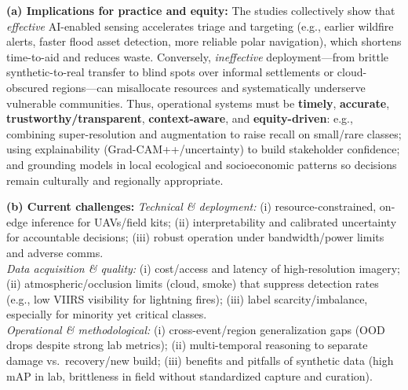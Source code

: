 \documentclass[conference,a4paper]{IEEEtran}
\begin{document}
\noindent\hspace*{1em}\textbf{(a) Implications for practice and equity:}
The studies collectively show that \emph{effective} AI-enabled sensing accelerates triage and targeting (e.g., earlier wildfire alerts, faster flood asset detection, more reliable polar navigation), which shortens time-to-aid and reduces waste. Conversely, \emph{ineffective} deployment---from brittle synthetic-to-real transfer to blind spots over informal settlements or cloud-obscured regions---can misallocate resources and systematically underserve vulnerable communities. Thus, operational systems must be \textbf{timely}, \textbf{accurate}, \textbf{trustworthy/transparent}, \textbf{context-aware}, and \textbf{equity-driven}: e.g., combining super-resolution and augmentation to raise recall on small/rare classes; using explainability (Grad-CAM++/uncertainty) to build stakeholder confidence; and grounding models in local ecological and socioeconomic patterns so decisions remain culturally and regionally appropriate.

\noindent\hspace*{1em}\textbf{(b) Current challenges:}
\textit{Technical \& deployment:} (i) resource-constrained, on-edge inference for UAVs/field kits; (ii) interpretability and calibrated uncertainty for accountable decisions; (iii) robust operation under bandwidth/power limits and adverse comms.\\
\textit{Data acquisition \& quality:} (i) cost/access and latency of high-resolution imagery; (ii) atmospheric/occlusion limits (cloud, smoke) that suppress detection rates (e.g., low VIIRS visibility for lightning fires); (iii) label scarcity/imbalance, especially for minority yet critical classes.\\
\textit{Operational \& methodological:} (i) cross-event/region generalization gaps (OOD drops despite strong lab metrics); (ii) multi-temporal reasoning to separate damage vs.\ recovery/new build; (iii) benefits and pitfalls of synthetic data (high mAP in lab, brittleness in field without standardized capture and curation).
\end{document}

